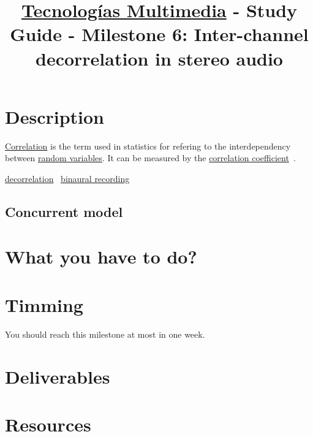 \title{\href{https://www.ual.es/estudios/grados/presentacion/plandeestudios/asignatura/4015/40154321?idioma=zh_CN}{Tecnologías Multimedia} - Study Guide - Milestone 6: Inter-channel decorrelation in stereo audio}

\maketitle

\section{Description}

\href{https://en.wikipedia.org/wiki/Correlation_and_dependence}{Correlation} is the term used in statistics for refering to the interdependency between \href{https://en.wikipedia.org/wiki/Random_variable}{random variables}. It can be measured by the \href{https://www.mathsisfun.com/data/correlation.html}{correlation coefficient}~\cite{thinkstats}.

\href{https://en.wikipedia.org/wiki/Decorrelation}{decorrelation}~\cite{sayood2017introduction}
\href{https://en.wikipedia.org/wiki/Binaural_recording}{binaural recording}~\cite{}

\subsection{Concurrent model}


\section{What you have to do?}

\section{Timming}

You should reach this milestone at most in one week.

\section{Deliverables}

\section{Resources}


